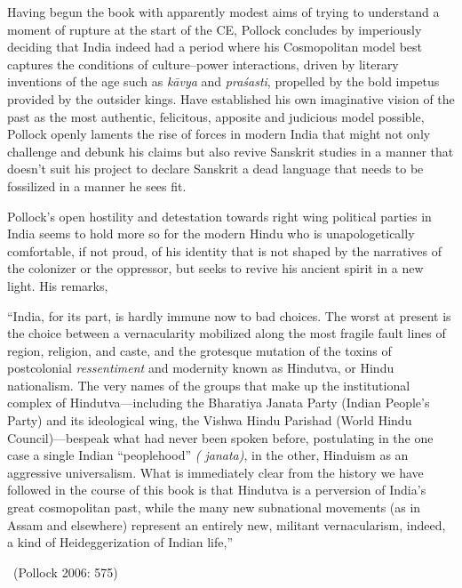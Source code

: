 Having begun the book with apparently modest aims of trying to understand a moment of rupture at the start of the CE, Pollock concludes by imperiously deciding that India indeed had a period where his Cosmopolitan model best captures the conditions of culture–power interactions, driven by literary inventions of the age such as \textit{kāvya} and \textit{praśasti}, propelled by the bold impetus provided by the outsider kings. Have established his own imaginative vision of the past as the most authentic, felicitous, apposite and judicious model possible, Pollock openly laments the rise of forces in modern India that might not only challenge and debunk his claims but also revive Sanskrit studies in a manner that doesn’t suit his project to declare Sanskrit a dead language that needs to be fossilized in a manner he sees fit.

\vskip 2pt

Pollock’s open hostility and detestation towards right wing political parties in India seems to hold more so for the modern Hindu who is unapologetically comfortable, if not proud, of his identity that is not shaped by the narratives of the colonizer or the oppressor, but seeks to revive his ancient spirit in a new light. His remarks,

\vskip 5pt

\begin{myquote}
“India, for its part, is hardly immune now to bad choices. The worst at present is the choice between a vernacularity mobilized along the most fragile fault lines of region, religion, and caste, and the grotesque mutation of the toxins of postcolonial \textit{ressentiment} and modernity known as Hindutva, or Hindu nationalism. The very names of the groups that make up the institutional complex of Hindutva—including the Bharatiya Janata Party (Indian People’s Party) and its ideological wing, the Vishwa Hindu Parishad (World Hindu Council)—bespeak what had never been spoken before, postulating in the one case a single Indian “peoplehood” \textit{( janata)}, in the other, Hinduism as an aggressive universalism. What is immediately clear from the history we have followed in the course of this book is that Hindutva is a perversion of India’s great cosmopolitan past, while the many new subnational movements (as in Assam and elsewhere) represent an entirely new, militant vernacularism, indeed, a kind of Heideggerization of Indian life,” 

~\hfill (Pollock 2006: 575)
\end{myquote}

